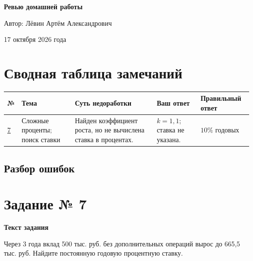 \documentclass[12pt,a4paper]{article}
\newcommand{\rubric}[1]{\par\smallskip\noindent\textbf{#1}\par\nobreak\smallskip}
\begin{document}
\begin{titlepage}
\centering
\vspace*{0.28\textheight}
{\Huge\bfseries Ревью домашней работы\par}
\vspace{2.4cm}
{\large Автор: Лёвин Артём Александрович\par}
\vspace{0.8cm}
{\large 17 октября 2026 года\par}
\vfill
{}
\vspace{0.8cm}
\end{titlepage}

\newpage
\section*{Сводная таблица замечаний}
\small
\begingroup\setlength{\tabcolsep}{4pt}
\begin{tabular}{@{}p{1.1cm}p{3.2cm}p{4.4cm}p{3.0cm}p{2.7cm}@{}}
\toprule
\textbf{№} & \textbf{Тема} & \textbf{Суть недоработки} & \textbf{Ваш ответ} & \textbf{Правильный ответ}\\
\midrule
\hyperref[task:7]{7} & Сложные проценты; поиск ставки & Найден коэффициент роста, но не вычислена ставка в процентах. & $k=1{,}1$; ставка не указана. & $10\%$ годовых\\
\bottomrule
\end{tabular}
\endgroup
\normalsize

\newpage
\vspace*{\fill}
\begin{center}
\section*{Разбор ошибок}
\end{center}
\vspace*{\fill}

\newpage
{}\label{task:7}
\section*{Задание № 7}

\rubric{Текст задания}
Через 3 года вклад 500 тыс. руб. без дополнительных операций вырос до 665,5 тыс. руб. Найдите постоянную годовую процентную ставку.
\end{document}
